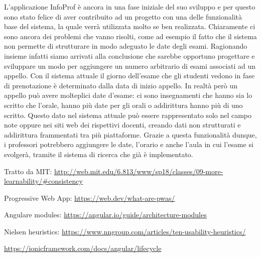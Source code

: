 \documentclass[Lau, oneside, noexaminfo]{sapthesis}%
\begin{document}
L'applicazione InfoProf è ancora in una fase iniziale del suo sviluppo e per questo sono stato felice di aver contribuito ad un progetto con una delle funzionalità base del sistema, la quale verrà utilizzata molto se ben realizzata. Chiaramente ci sono ancora dei problemi che vanno risolti, come ad esempio il fatto che il sistema non permette di strutturare in modo adeguato le date degli esami. Ragionando insieme infatti siamo arrivati alla conclusione che sarebbe opportuno progettare e sviluppare un modo per aggiungere un numero arbitrario di esami associati ad un appello. Con il sistema attuale il giorno dell'esame che gli studenti vedono in fase di prenotazione è determinato dalla data di inizio appello. In realtà però un appello può avere molteplici date d'esame: ci sono insegnamenti che hanno sia lo scritto che l'orale, hanno più date per gli orali o addirittura hanno più di uno scritto. Questo dato nel sistema attuale può essere rappresentato solo nel campo note oppure nei siti web dei rispettivi docenti, creando dati non strutturati e addirittura frammentati tra più piattaforme. Grazie a questa funzionalità dunque, i professori potrebbero aggiungere le date, l'orario e anche l'aula in cui l'esame si svolgerà, tramite il sistema di ricerca che già è implementato.


\backmatter
{}
\begin{thebibliography}{17}

Tratto da MIT:
\url{http://web.mit.edu/6.813/www/sp18/classes/09-more-learnability/#consistency}

Progressive Web App:
\url{https://web.dev/what-are-pwas/}

Angulare modules:
\url{https://angular.io/guide/architecture-modules}

Nielsen heuristics:
\url{https://www.nngroup.com/articles/ten-usability-heuristics/}

\url{https://ionicframework.com/docs/angular/lifecycle}

\end{thebibliography}
\end{document}
